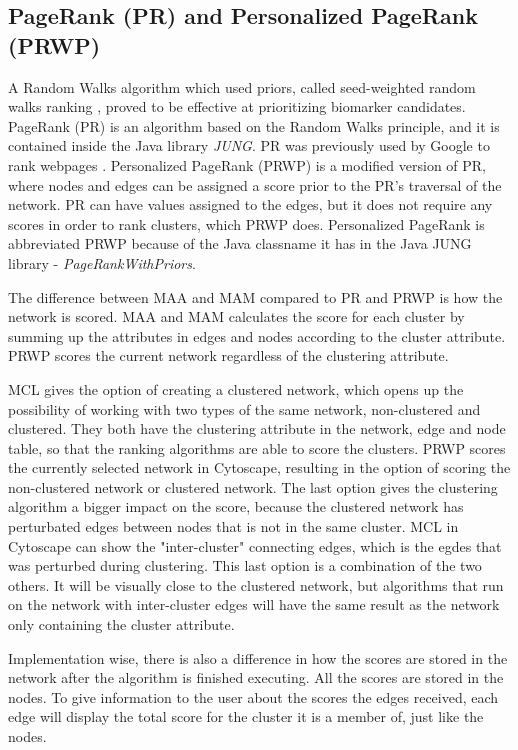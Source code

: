 \subsection{PageRank (PR) and Personalized PageRank (PRWP)}
A Random Walks\cite{random-walks2} algorithm which used priors, called
seed-weighted random walks ranking \cite{sw-rwr}, proved to be effective at
prioritizing biomarker candidates. PageRank (PR) is an algorithm based on the
Random Walks principle, and it is contained inside the Java library
\textit{JUNG}\cite{jung}.  PR was previously used by Google to rank webpages
\cite{pagerank}.  Personalized PageRank (PRWP)\cite{pr-bio} is a modified
version of PR, where nodes and edges can be assigned a score prior to the PR's
traversal of the network. PR can have values assigned to the edges, but it does
not require any scores in order to rank clusters, which PRWP does. Personalized
PageRank is abbreviated PRWP because of the Java classname it has in the Java
JUNG library
- \textit{PageRankWithPriors}.

The difference between MAA and MAM compared to PR and PRWP is how the network is
scored. MAA and MAM calculates the score for each cluster by summing up the
attributes in edges and nodes according to the cluster attribute. PRWP scores
the current network regardless of the clustering attribute. 

MCL gives the option of creating a clustered network, which opens up the
possibility of working with two types of the same network, non-clustered and
clustered. They both have the clustering attribute in the network, edge and node
table, so that the ranking algorithms are able to score the clusters.  PRWP
scores the currently selected network in Cytoscape, resulting in the option of
scoring the non-clustered network or clustered network. The last option gives
the clustering algorithm a bigger impact on the score, because the clustered
network has perturbated edges between nodes that is not in the same cluster. MCL
in Cytoscape can show the "inter-cluster" connecting edges, which is the egdes
that was perturbed during clustering. This last option is a combination of the
two others. It will be visually close to the clustered network, but algorithms
that run on the network with inter-cluster edges will have the same result as
the network only containing the cluster attribute.

Implementation wise, there is also a difference in how the scores are stored in
the network after the algorithm is finished executing. All the scores are stored
in the nodes. To give information to the user about the scores the edges
received, each edge will display the total score for the cluster it is a member
of, just like the nodes.

